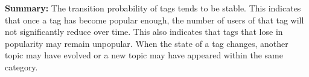 \documentclass[conference]{IEEEtran}
\begin{document}



\noindent \textbf{Summary:}
The transition probability of tags tends to be stable.
This indicates that once a tag has become popular enough, the number of users of that tag will not significantly reduce over time. This also indicates that tags that lose in popularity may remain unpopular.
When the state of a tag changes, another topic may have evolved or a new topic may have appeared within the same category.

\end{document}
